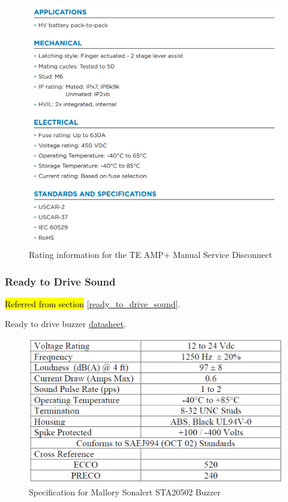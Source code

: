 \documentclass{article}
\DeclareRobustCommand{\hlr}[1]{{\sethlcolor{pink}\hl{#1}}}
\begin{document}
\begin{figure}[H]
	\includegraphics[width=0.7\linewidth]{MSD_Ratings.png}
	\caption{Rating information for the TE AMP+ Manual Service Disconnect}
\end{figure}

\subsubsection{Ready to Drive Sound}\label{Ready to Drive}
\hlr{Referred from section }\ref{ready_to_drive_sound}.

Ready to drive buzzer \href{http://www.mallory-sonalert.com/specifications/STA20502.PDF}{datasheet}. \newline
\begin{figure}[H]
	\includegraphics[width=\linewidth]{Buzzer_Specifications}
	\caption{Specification for Mallory Sonalert STA20502 Buzzer}
\end{figure}
\end{document}
